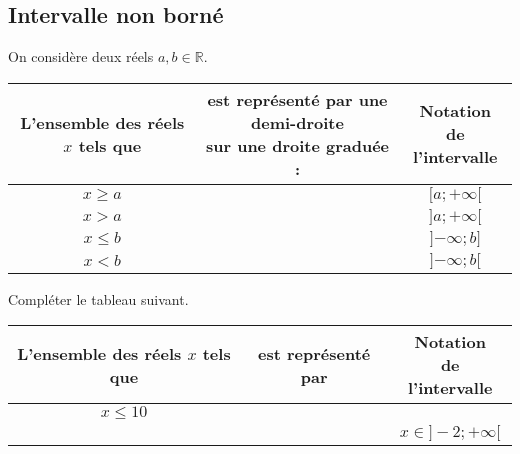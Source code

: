 \documentclass[11pt]{article}
\begin{document}
\subsection{Intervalle non borné}
On considère deux réels $a,b\in\mathbb{R}$.
\begin{center}
  \renewcommand{\arraystretch}{2}
  \begin{tabular}{|c|c|c|}
    \hline
    \makecell{L'ensemble des\\réels $x$ tels que} & \makecell{est représenté par
      une \textbf{demi-droite}\\sur une droite graduée :}
      &\makecell{Notation\\de l'intervalle} \\
      \hline
      $x\geq a$ & & $[a; +\infty[$ \\
      \hline
      $x> a$ & & $]a; +\infty[$ \\
      \hline
      $x\leq b$ & & $]{-\infty}; b]$ \\
      \hline
    $x < b$ & & $]{-\infty}; b[$ \\
      \hline
  \end{tabular}
\end{center}

\begin{exemple}
  Compléter le tableau suivant.
  \begin{center}
  \renewcommand{\arraystretch}{2}
  \begin{tabular}{|c|c|c|}
    \hline
    \makecell{L'ensemble des\\réels $x$ tels que} &\phantom{c'est pas terrible}est représenté
    par\phantom{c'est pas terrible}&\makecell{Notation\\de l'intervalle} \\
      \hline
      $x\leq 10$ & & \\
      \hline
      & & $x\in]-2; +\infty[$ \\
      \hline
  \end{tabular}
   
  \end{center}
\end{exemple}
\end{document}
